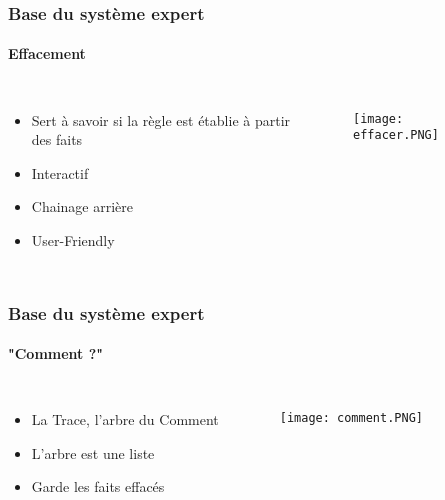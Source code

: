 \documentclass[10pt]{beamer}
\begin{document}
\begin{frame}
	\frametitle{\textbf {\Large Base du système expert}}
	\framesubtitle{\large Effacement}
	
	\begin{columns}
			\begin{itemize}
      
      
				\item Sert à savoir si la règle est établie à partir des faits
				\smallskip
				\item Interactif %
				\smallskip
				\item Chainage arrière %
				\smallskip
				\item User-Friendly %
			\end{itemize}
			
			\begin{figure}
				\texttt{[image: effacer.PNG]}
 				\label{pic: Base de connaissance}
 			\end{figure}
	\end{columns}

\end{frame}

\begin{frame}
	\frametitle{\textbf {\Large Base du système expert}}
	\framesubtitle{\large "Comment ?"}
	
	\begin{columns}
		\column{0.4\textwidth}
			\begin{itemize}
				\item La Trace, l'arbre du Comment
				\smallskip
				\item L'arbre est une liste
				\smallskip
				\item Garde les faits effacés
			\end{itemize}
			
		\column{0.65\textwidth}
			\begin{figure}
				\texttt{[image: comment.PNG]}
 				\label{pic: Base de connaissance}
 			\end{figure}
	\end{columns}

\end{frame}
\end{document}
